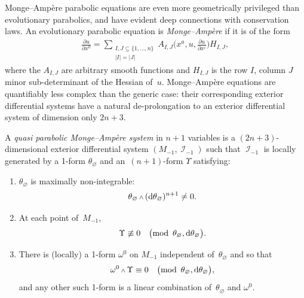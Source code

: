 \documentclass[10pt,a4paper]{amsart}
\DeclareMathOperator{\I}{\mathcal{I}}
\renewcommand{\d}{{\rm d}}
\renewcommand{\mod}[1]{\quad\big(\mathrm{mod\enspace} #1\big)}
\newcommand{\pDeriv}[2]{\frac{\partial #1}{\partial #2}}
\newcommand{\w}{{\mathchoice{\,{\scriptstyle\wedge}\,}{{\scriptstyle\wedge}}
 {{\scriptscriptstyle\wedge}}{{\scriptscriptstyle\wedge}}}}
\newcommand{\thetas}[1]{\theta_{#1}}
\numberwithin{equation}{section}
\begin{document}
Monge--Amp\`ere parabolic equations are even more geometrically privileged than evolutionary parabolics, and have evident deep connections with conservation laws. An evolutionary parabolic equation is \emph{Monge--Amp\`ere} if it is of the form
\begin{gather*}%
 \pDeriv{u}{x^0} = \sum_{\substack{I, J \subseteq \{1,\dots,n\} \\ |I|=|J|}} A_{I,J}\bigg(x^a,u,\pDeriv{u}{x^i}\bigg) H_{I,J} ,
\end{gather*}
where the $A_{I,J}$ are arbitrary smooth functions and $H_{I,J}$ is the row $I$, column $J$ minor sub-determinant of the Hessian of~$u$. Monge--Amp\`ere equations are quantifiably less complex than the generic case: their corresponding exterior differential systems have a natural de-prolongation to an exterior differential system of dimension only $2n+3$.
\begin{Definition}%
 A \emph{quasi parabolic Monge--Amp\`ere system} in $n+1$ variables is a $(2n+3)$-di\-men\-sio\-nal exterior differential system $(M_{-1},\I_{-1})$ such that $\I_{-1}$ is locally generated by a 1-form $\thetas{\varnothing}$ and an~$(n+1)$-form $\Upsilon$ satisfying:
 \begin{enumerate}\itemsep=0pt
 \item $\thetas{\varnothing}$ is maximally non-integrable:
 \begin{gather*}
 \thetas{\varnothing} \w (\d\thetas{\varnothing})^{n+1} \neq 0 .
 \end{gather*}
 \item At each point of~$M_{-1}$,
 \begin{gather*}
 \Upsilon \not\equiv 0 \mod{\thetas{\varnothing}, \d\thetas{\varnothing}} .
 \end{gather*}
 \item There is (locally) a 1-form $\omega^0$ on $M_{-1}$ independent of~$\thetas{\varnothing}$ and so that
 \begin{gather*}
 \omega^0\w\Upsilon \equiv 0 \mod{\thetas{\varnothing}, \d\thetas{\varnothing}} ,
 \end{gather*}
 and any other such 1-form is a linear combination of~$\thetas{\varnothing}$ and $\omega^0$.
 \end{enumerate}
\end{Definition}
\end{document}
